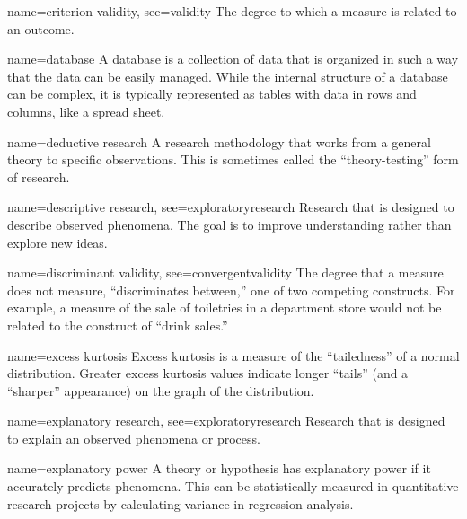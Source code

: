 {name={criterion validity},
	see={validity}}
{%
	The degree to which a measure is related to an outcome.  
}

{name={database}}
{%
	A database is a collection of data that is organized in such a way that the data can be easily managed. While the internal structure of a database can be complex, it is typically represented as tables with data in rows and columns, like a spread sheet.
}

{name={deductive research}}
{%
	A research methodology that works from a general theory to specific observations. This is sometimes called the ``theory-testing'' form of research.
}

{name={descriptive research},
 see={exploratoryresearch}}
{%
	Research that is designed to describe observed phenomena. The goal is to improve 	understanding rather than explore new ideas.
}

{name={discriminant validity},
	see={convergentvalidity}}
{%
	The degree that a measure does not measure, ``discriminates between,'' one of two competing constructs. For example, a measure of the sale of toiletries in a department store would not be related to the construct of ``drink sales.'' 
}


{name={excess kurtosis}}
{%
	Excess kurtosis is a measure of the ``tailedness'' of a normal distribution. Greater excess kurtosis values indicate longer ``tails'' (and a ``sharper'' appearance) on the graph of the distribution.
}

{name={explanatory research},
	see={exploratoryresearch}}
{%
	Research that is designed to explain an observed phenomena or process. 
}

{name={explanatory power}}
{%
	A theory or hypothesis has explanatory power if it accurately predicts phenomena. This can be statistically measured in quantitative research projects by calculating variance in regression analysis.
}


